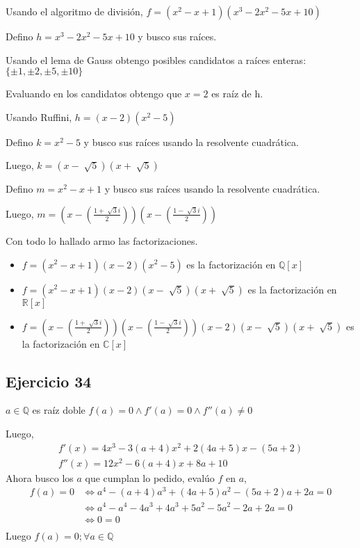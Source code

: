 Usando el algoritmo de división, $ f = (x^2-x+1)(x^3-2x^2-5x+10) $

Defino $ h = x^3-2x^2-5x+10 $ y busco sus raíces.

Usando el lema de Gauss obtengo posibles candidatos a raíces enteras: $ \{ \pm 1, \pm 2, \pm 5, \pm 10 \} $

Evaluando en los candidatos obtengo que $ x = 2 $ es raíz de h.

Usando Ruffini, $ h = (x-2)(x^2-5) $

Defino $ k = x^2 - 5 $ y busco sus raíces usando la resolvente cuadrática.

Luego, $ k = (x-\sqrt[]{5})(x+\sqrt[]{5}) $

Defino $ m = x^2-x+1 $ y busco sus raíces usando la resolvente cuadrática.

Luego, $ m = (x-(\frac{1+\sqrt[]{3}i}{2}))(x-(\frac{1-\sqrt[]{3}i}{2})) $

Con todo lo hallado armo las factorizaciones.

\begin{itemize}
    \item $ f = (x^2-x+1)(x-2)(x^2-5) $ es la factorización en $ \mathbb{Q}[x] $
    \item $ f = (x^2-x+1)(x-2)(x-\sqrt[]{5})(x+\sqrt[]{5}) $ es la factorización en $ \mathbb{R}[x] $
    \item $ f = (x-(\frac{1+\sqrt[]{3}i}{2}))(x-(\frac{1-\sqrt[]{3}i}{2}))(x-2)(x-\sqrt[]{5})(x+\sqrt[]{5}) $ es la factorización en $ \mathbb{C}[x] $
\end{itemize}

\subsection{Ejercicio 34}

$ a \in \mathbb{Q} $ es raíz doble $ f(a) =  0 \wedge f'(a) = 0 \wedge f''(a) \neq 0 $

Luego,
\begin{align*}
    f'(x) = 4x^3 - 3(a+4)x^2 + 2(4a+5)x-(5a+2) \\
    f''(x) = 12x^2 - 6(a+4)x + 8a + 10
\end{align*}
Ahora busco los $ a $ que cumplan lo pedido, evalúo $f$ en $a$,
\begin{align*}
    f(a) = 0 &\iff a^4 - (a+4)a^3 + (4a+5)a^2 - (5a+2)a + 2a = 0 \\
    &\iff a^4 - a^4 - 4a^3 + 4a^3 + 5a^2 - 5a^2 -2a + 2a = 0 \\
    &\iff 0 = 0 \\
\end{align*}
Luego $ f(a) = 0; \forall a \in \mathbb{Q} $


